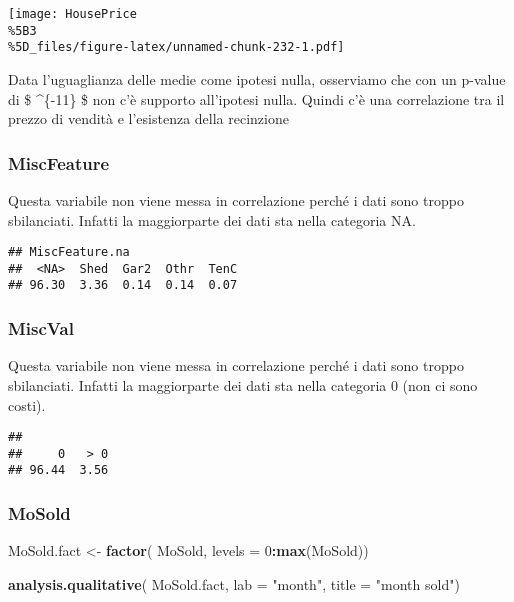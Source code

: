 \documentclass[
]{article}
\newenvironment{Shaded}{\begin{snugshade}}{\end{snugshade}}
\newcommand{\AttributeTok}[1]{\textcolor[rgb]{0.13,0.29,0.53}{#1}}
\newcommand{\DecValTok}[1]{\textcolor[rgb]{0.00,0.00,0.81}{#1}}
\newcommand{\FunctionTok}[1]{\textcolor[rgb]{0.13,0.29,0.53}{\textbf{#1}}}
\newcommand{\NormalTok}[1]{#1}
\newcommand{\OtherTok}[1]{\textcolor[rgb]{0.56,0.35,0.01}{#1}}
\newcommand{\SpecialCharTok}[1]{\textcolor[rgb]{0.81,0.36,0.00}{\textbf{#1}}}
\newcommand{\StringTok}[1]{\textcolor[rgb]{0.31,0.60,0.02}{#1}}
\begin{document}
\texttt{[image: HousePrice\\\%5B3\\\%5D\_files/figure-latex/unnamed-chunk-232-1.pdf]}

Data l'uguaglianza delle medie come ipotesi nulla, osserviamo che con un
p-value di \$ \^{}\{-11\} \$ non c'è supporto all'ipotesi
nulla. Quindi c'è una correlazione tra il prezzo di vendità e
l'esistenza della recinzione

\subsubsection{MiscFeature}\label{miscfeature-1}

Questa variabile non viene messa in correlazione perché i dati sono
troppo sbilanciati. Infatti la maggiorparte dei dati sta nella categoria
NA.

\begin{verbatim}
## MiscFeature.na
##  <NA>  Shed  Gar2  Othr  TenC 
## 96.30  3.36  0.14  0.14  0.07
\end{verbatim}

\subsubsection{MiscVal}\label{miscval-1}

Questa variabile non viene messa in correlazione perché i dati sono
troppo sbilanciati. Infatti la maggiorparte dei dati sta nella categoria
0 (non ci sono costi).

\begin{verbatim}
## 
##     0   > 0 
## 96.44  3.56
\end{verbatim}

\subsubsection{MoSold}\label{mosold-1}

\begin{Shaded}
\begin{Highlighting}[]
\NormalTok{MoSold.fact }\OtherTok{\textless{}{-}} \FunctionTok{factor}\NormalTok{(}
\NormalTok{    MoSold,}
    \AttributeTok{levels =} \DecValTok{0}\SpecialCharTok{:}\FunctionTok{max}\NormalTok{(MoSold))}

\FunctionTok{analysis.qualitative}\NormalTok{(}
\NormalTok{    MoSold.fact,}
    \AttributeTok{lab =} \StringTok{"month"}\NormalTok{,}
    \AttributeTok{title =} \StringTok{"month sold"}\NormalTok{)}
\end{Highlighting}
\end{Shaded}
\end{document}
